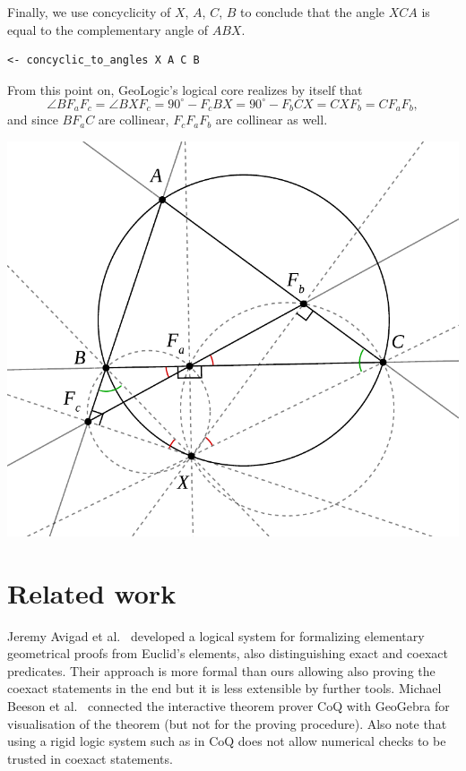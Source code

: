 \documentclass[runningheads]{llncs}
\begin{document}
Finally, we use concyclicity of $X$, $A$, $C$, $B$ to conclude that
the angle $XCA$ is equal to the complementary angle of $ABX$.

\begin{verbatim}
<- concyclic_to_angles X A C B
\end{verbatim}

From this point on, GeoLogic's logical core realizes by itself that
$$
\angle BF_aF_c = \angle BXF_c = 90^\circ-F_cBX = 90^\circ-F_bCX =
CXF_b = CF_aF_b,
$$
and since $BF_aC$ are collinear, $F_cF_aF_b$ are collinear as well.

\bigskip
\centerline{%
  \includegraphics[width = \imgwidth]{simson5.pdf}%
}

\section{Related work}

Jeremy Avigad et al.~\cite{Coexact} developed a logical system for
formalizing elementary geometrical proofs from Euclid's elements, also
distinguishing exact and coexact predicates. Their approach is more
formal than ours allowing also proving the coexact statements in the
end but it is less extensible by further tools.
Michael Beeson et al.~\cite{GeoCoQ} connected the interactive theorem
prover CoQ with GeoGebra for visualisation of the theorem (but not for
the proving procedure). Also note that using a rigid logic system such
as in CoQ does not allow numerical checks to be trusted in coexact
statements.
\end{document}

